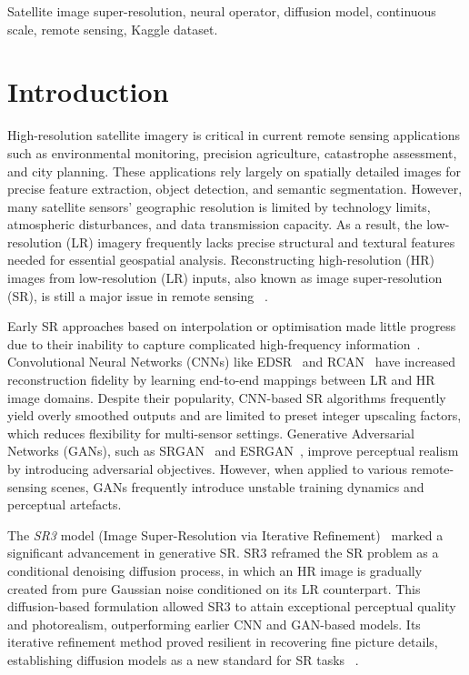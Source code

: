 \documentclass[conference]{IEEEtran}
\begin{document}
\begin{IEEEkeywords}
Satellite image super-resolution, neural operator, diffusion model, continuous scale, remote sensing, Kaggle dataset.
\end{IEEEkeywords}


\section{Introduction}
High-resolution satellite imagery is critical in current remote sensing applications such as environmental monitoring, precision agriculture, catastrophe assessment, and city planning.  These applications rely largely on spatially detailed images for precise feature extraction, object detection, and semantic segmentation.  However, many satellite sensors' geographic resolution is limited by technology limits, atmospheric disturbances, and data transmission capacity.  As a result, the low-resolution (LR) imagery frequently lacks precise structural and textural features needed for essential geospatial analysis.  Reconstructing high-resolution (HR) images from low-resolution (LR) inputs, also known as image super-resolution (SR), is still a major issue in remote sensing ~\cite{ledig2017photo, lim2017enhanced}.

Early SR approaches based on interpolation or optimisation made little progress due to their inability to capture complicated high-frequency information~\cite{dong2015image}.  Convolutional Neural Networks (CNNs) like EDSR~\cite{lim2017enhanced} and RCAN~\cite{zhang2018image} have increased reconstruction fidelity by learning end-to-end mappings between LR and HR image domains.  Despite their popularity, CNN-based SR algorithms frequently yield overly smoothed outputs and are limited to preset integer upscaling factors, which reduces flexibility for multi-sensor settings.  Generative Adversarial Networks (GANs), such as SRGAN~\cite{ledig2017photo} and ESRGAN~\cite{wang2018esrgan}, improve perceptual realism by introducing adversarial objectives. However, when applied to various remote-sensing scenes, GANs frequently introduce unstable training dynamics and perceptual artefacts.

The \textit{SR3} model (Image Super-Resolution via Iterative Refinement)~\cite{saharia2022image} marked a significant advancement in generative SR.  SR3 reframed the SR problem as a conditional denoising diffusion process, in which an HR image is gradually created from pure Gaussian noise conditioned on its LR counterpart.  This diffusion-based formulation allowed SR3 to attain exceptional perceptual quality and photorealism, outperforming earlier CNN and GAN-based models.  Its iterative refinement method proved resilient in recovering fine picture details, establishing diffusion models as a new standard for SR tasks ~\cite{rombach2022high, ho2020denoising}.
\end{document}
